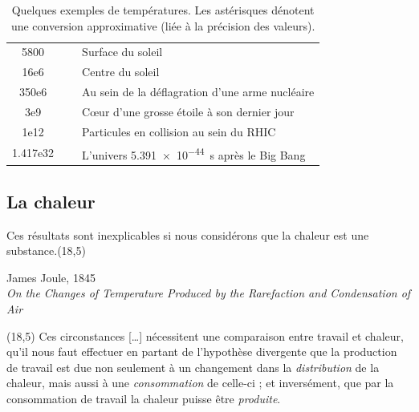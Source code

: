 \begin{table}
\begin{footnotesize}
\begin{spacing}{1}
\begin{innersidebox}
\begin{tabularx}{15.5cm}{@{}S@{}S|p{8.5cm}@{}}
			5800	& ~		& Surface du soleil \\
			16e6	& ~		& Centre du soleil \\
			350e6	& ~		& Au sein de la déflagration d’une arme nucléaire \\
			3e9	& ~		& Cœur d’une grosse étoile à son dernier jour \\
			1e12	& ~		& Particules en collision au sein du RHIC \\
			1.417e32	& ~	& L’univers \SI{5,391e-44}{\second} après le Big Bang \\
			\hline
		\end{tabularx}
		\end{innersidebox}
		\end{spacing}
		\end{footnotesize}
		\caption{Quelques exemples de températures. Les astérisques dénotent une conversion approximative (liée à la précision des valeurs).}
		\label{tab_temperatures}
		\end{table}
		
		
	\subsection{La chaleur}
	
			Ces résultats sont inexplicables si nous considérons que la chaleur est une substance.\nolinebreak\makebox(18,5){\color{gray}}\par\vspace{-0.3cm}\begin{flushright}James Joule, 1845\\\textit{On the Changes of Temperature Produced by the Rarefaction and Condensation of Air}~\cite{joule1845}\end{flushright}\vspace{-1em}
		\makebox(18,5){\color{gray}}
			Ces circonstances […] nécessitent une comparaison entre travail et chaleur, qu’il nous faut effectuer en partant de l’hypothèse divergente que la production de travail est due non seulement à un changement dans la \emph{distribution} de la chaleur, mais aussi à une \emph{consommation} de celle-ci ; et inversément, que par la consommation de travail la chaleur puisse être \emph{produite}.


